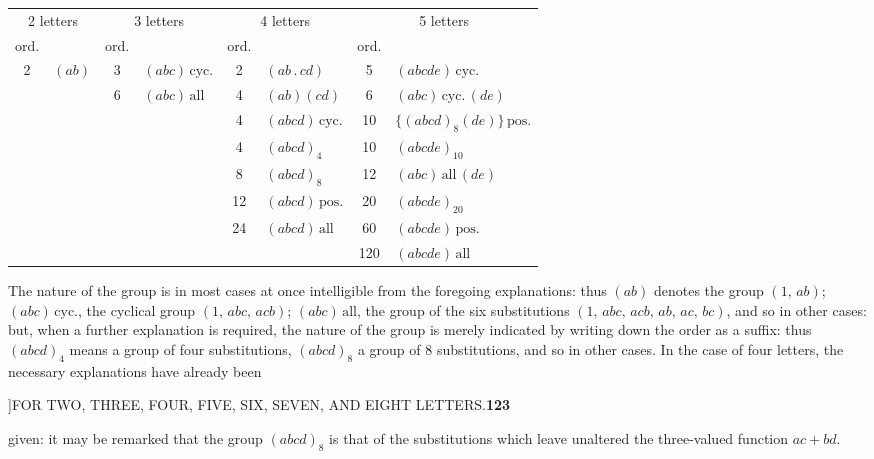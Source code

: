 \documentclass[11pt]{article}
\begin{document}
\smallskip
\begin{center}
\renewcommand{\arraystretch}{1.15}
\setlength{\tabcolsep}{6pt}
\small
\begin{tabular}{|cl|cl|cl|cl|}
\hline
\multicolumn{2}{|c|}{2 letters} & \multicolumn{2}{c|}{3 letters} & \multicolumn{2}{c|}{4 letters} & \multicolumn{2}{c|}{5 letters}\\
ord. & & ord. & & ord. & & ord. & \\
\hline
2 & $(ab)$ & 3 & $(abc)\,\text{cyc.}$ & 2 & $(ab\,.\,cd)$ & 5 & $(abcde)\,\text{cyc.}$\\
  &        & 6 & $(abc)\,\text{all}$  & 4 & $(ab)(cd)$    & 6 & $(abc)\,\text{cyc.}\,(de)$\\
  &        &   &                       & 4 & $(abcd)\,\text{cyc.}$ & 10 & $\{(abcd)_{8}(de)\}\,\text{pos.}$\\
  &        &   &                       & 4 & $(abcd)_{4}$ & 10 & $(abcde)_{10}$\\
  &        &   &                       & 8 & $(abcd)_{8}$ & 12 & $(abc)\,\text{all}\,(de)$\\
  &        &   &                       & 12 & $(abcd)\,\text{pos.}$ & 20 & $(abcde)_{20}$\\
  &        &   &                       & 24 & $(abcd)\,\text{all}$  & 60 & $(abcde)\,\text{pos.}$\\
  &        &   &                       &    &                       & 120 & $(abcde)\,\text{all}$\\
\hline
\end{tabular}
\end{center}

\smallskip
\hspace{1em} The nature of the group is in most cases at once intelligible
from the foregoing explanations: thus $(ab)$ denotes the group $(1,\,ab)$;
$(abc)\,\text{cyc.}$, the cyclical group $(1,\,abc,\,acb)$;
$(abc)\,\text{all}$, the group of the six substitutions
$(1,\,abc,\,acb,\,ab,\,ac,\,bc)$, and so in other cases: but, when a further
explanation is required, the nature of the group is merely indicated by
writing down the order as a suffix: thus $(abcd)_{4}$ means a group of four
substitutions, $(abcd)_{8}$ a group of 8 substitutions, and so in other
cases. In the case of four letters, the necessary explanations have already
been

\newpage
{}]\hfill FOR TWO, THREE, FOUR, FIVE, SIX, SEVEN, AND EIGHT LETTERS.\hfill\textbf{123}

\smallskip
given: it may be remarked that the group $(abcd)_{8}$ is that of the
substitutions which leave unaltered the three-valued function $ac+bd$.
\end{document}
